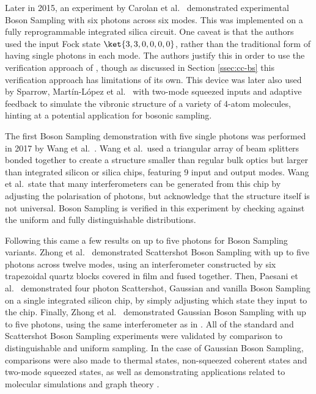 Later in 2015, an experiment by Carolan et al.~\cite{carolan2015} demonstrated experimental Boson Sampling with six photons across six modes. This was implemented on a fully reprogrammable integrated silica circuit. One caveat is that the authors used the input Fock state $\ket{3,3,0,0,0,0}$, rather than the traditional form of having single photons in each mode. The authors justify this in order to use the verification approach of \cite{carolan2014}, though as discussed in Section \ref{ssec:cc-bs} this verification approach has limitations of its own. This device was later also used by Sparrow, Mart\'{i}n-L\'{o}pez et al.~\cite{sparrow2018} with two-mode squeezed inputs and adaptive feedback to simulate the vibronic structure of a variety of 4-atom molecules, hinting at a potential application for bosonic sampling.

The first Boson Sampling demonstration with five single photons was performed in 2017 by Wang et al.~\cite{wang2017}. Wang et al.\ used a triangular array of beam splitters bonded together to create a structure smaller than regular bulk optics but larger than integrated silicon or silica chips, featuring 9 input and output modes. Wang et al.\ state that many interferometers can be generated from this chip by adjusting the polarisation of photons, but acknowledge that the structure itself is not universal. Boson Sampling is verified in this experiment by checking against the uniform and fully distinguishable distributions.

Following this came a few results on up to five photons for Boson Sampling variants. Zhong et al.~\cite{zhong2018} demonstrated Scattershot Boson Sampling with up to five photons across twelve modes, using an interferometer constructed by six trapezoidal quartz blocks covered in film and fused together. Then, Paesani et al.~\cite{paesani2018} demonstrated four photon Scattershot, Gaussian and vanilla Boson Sampling on a single integrated silicon chip, by simply adjusting which state they input to the chip. Finally, Zhong et al.~\cite{zhong2019} demonstrated Gaussian Boson Sampling with up to five photons, using the same interferometer as in \cite{zhong2018}. All of the standard and Scattershot Boson Sampling experiments were validated by comparison to distinguishable and uniform sampling. In the case of Gaussian Boson Sampling, comparisons were also made to thermal states, non-squeezed coherent states and two-mode squeezed states, as well as demonstrating applications related to molecular simulations and graph theory \cite{paesani2018, zhong2019}.

